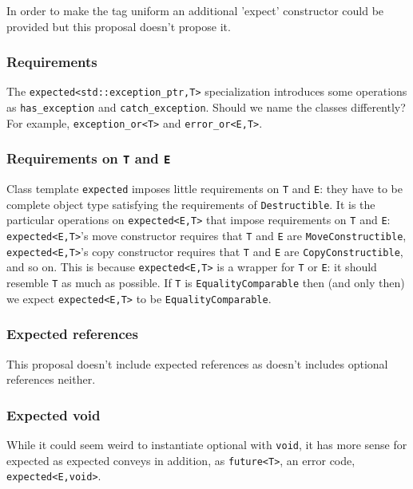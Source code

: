 \documentclass[a4paper,10pt]{article}
\newcommand{\cpp}[1]{\lstinline{#1}}
\begin{document}
In order to make the tag uniform an additional 'expect' constructor could be provided but this proposal doesn't propose it.

\subsubsection{Requirements}

The \cpp{expected<std::exception_ptr,T>} specialization introduces some operations as \cpp{has_exception} and \cpp{catch_exception}. Should we name the classes differently? For example, \cpp{exception_or<T>} and \cpp{error_or<E,T>}.

\subsubsection{Requirements on \cpp{T} and \cpp{E}}

Class template \cpp{expected} imposes little requirements on \cpp{T} and \cpp{E}: they have to be  complete object type satisfying the requirements of \cpp{Destructible}. It is the particular operations on \cpp{expected<E,T>} that impose requirements on \cpp{T} and \cpp{E}: \cpp{expected<E,T>}'s move constructor requires that \cpp{T} and \cpp{E} are \cpp{MoveConstructible}, \cpp{expected<E,T>}'s copy constructor requires that \cpp{T} and \cpp{E} are \cpp{CopyConstructible}, and so on. This is because \cpp{expected<E,T>} is a wrapper for \cpp{T} or \cpp{E}: it should resemble \cpp{T} as much as possible. If \cpp{T} is \cpp{EqualityComparable} then (and only then) we expect \cpp{expected<E,T>} to be \cpp{EqualityComparable}. 


\subsubsection{Expected references}

This proposal doesn't include expected references as \cite{optional} doesn't  includes optional references neither.

\subsubsection{Expected void}

While it could seem weird to instantiate optional with \cpp{void}, it has more sense for expected as expected conveys in addition, as \cpp{future<T>},  an error code, \cpp{expected<E,void>}.
\end{document}
